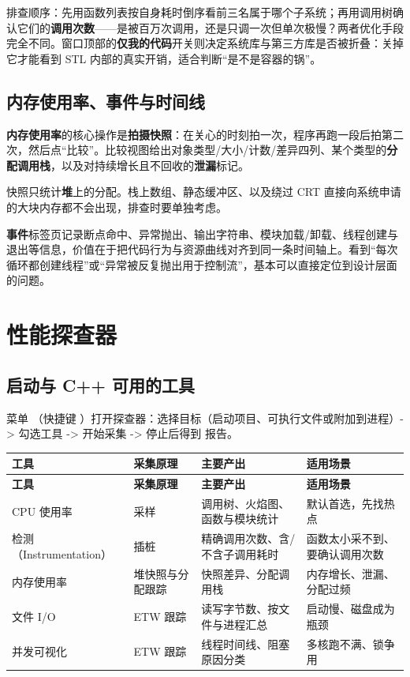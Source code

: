 排查顺序：先用函数列表按自身耗时倒序看前三名属于哪个子系统；再用调用树确认它们的\textbf{调用次数}——是被百万次调用，还是只调一次但单次极慢？两者优化手段完全不同。窗口顶部的\textbf{仅我的代码}开关则决定系统库与第三方库是否被折叠：关掉它才能看到 STL 内部的真实开销，适合判断“是不是容器的锅”。

\subsection{内存使用率、事件与时间线}
\textbf{内存使用率}的核心操作是\textbf{拍摄快照}：在关心的时刻拍一次，程序再跑一段后拍第二次，然后点“比较”。比较视图给出对象类型/大小/计数/差异四列、某个类型的\textbf{分配调用栈}，以及对持续增长且不回收的\textbf{泄漏}标记。

\begin{warnbox}[注意]
快照只统计\textbf{堆}上的分配。栈上数组、静态缓冲区、以及绕过 CRT 直接向系统申请的大块内存都不会出现，排查时要单独考虑。
\end{warnbox}

\textbf{事件}标签页记录断点命中、异常抛出、输出字符串、模块加载/卸载、线程创建与退出等信息，价值在于把代码行为与资源曲线对齐到同一条时间轴上。看到“每次循环都创建线程”或“异常被反复抛出用于控制流”，基本可以直接定位到设计层面的问题。

\section{性能探查器}
\subsection{启动与 C++ 可用的工具}
菜单 （快捷键 ）打开探查器：选择目标（启动项目、可执行文件或附加到进程）-> 勾选工具 -> 开始采集 -> 停止后得到  报告。

\begin{longtable}{L{3.4cm}L{2.6cm}L{4.4cm}L{3.8cm}}
\toprule \textbf{工具} & \textbf{采集原理} & \textbf{主要产出} & \textbf{适用场景} \\ \midrule
\endfirsthead
\toprule \textbf{工具} & \textbf{采集原理} & \textbf{主要产出} & \textbf{适用场景} \\ \midrule
\endhead
\bottomrule \endlastfoot
CPU 使用率 & 采样 & 调用树、火焰图、函数与模块统计 & 默认首选，先找热点 \\
检测（Instrumentation） & 插桩 & 精确调用次数、含/不含子调用耗时 & 函数太小采不到、要确认调用次数 \\
内存使用率 & 堆快照与分配跟踪 & 快照差异、分配调用栈 & 内存增长、泄漏、分配过频 \\
文件 I/O & ETW 跟踪 & 读写字节数、按文件与进程汇总 & 启动慢、磁盘成为瓶颈 \\
并发可视化 & ETW 跟踪 & 线程时间线、阻塞原因分类 & 多核跑不满、锁争用 \\
\end{longtable}

